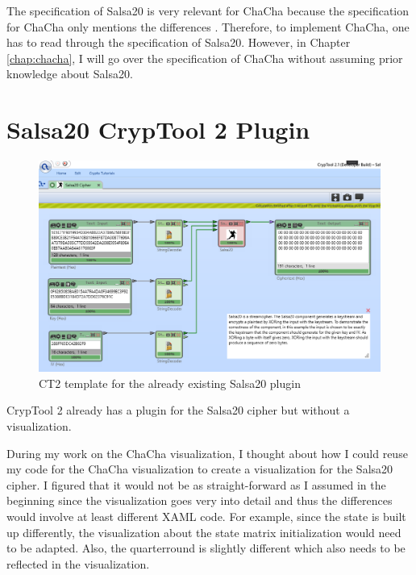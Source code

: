 The specification of Salsa20 is very relevant for ChaCha because the specification for ChaCha only mentions the differences \cite{chachaspec}. Therefore, to implement ChaCha, one has to read through the specification of Salsa20.  However, in Chapter \ref{chap:chacha}, I will go over the specification of ChaCha without assuming prior knowledge about Salsa20.


\section{Salsa20 CrypTool 2 Plugin}
\label{sec:salsaCT2Plugin}

\begin{figure}
\caption[Salsa20 CT2 template]{CT2 template for the already existing Salsa20 plugin}
\label{fig:salsa.template}
\centering
\includegraphics[width=\textwidth]{figures/ct2/salsa-crop.png}
\end{figure}

CrypTool 2 already has a plugin for the Salsa20 cipher but without a visualization.

During my work on the ChaCha visualization, I thought about how I could reuse my code for the ChaCha visualization to create a visualization for the Salsa20 cipher. I figured that it would not be as straight-forward as I assumed in the beginning since the visualization goes very into detail and thus the differences would involve at least different XAML code. For example, since the state is built up differently, the visualization about the state matrix initialization would need to be adapted. Also, the quarterround is slightly different which also needs to be reflected in the visualization. 

